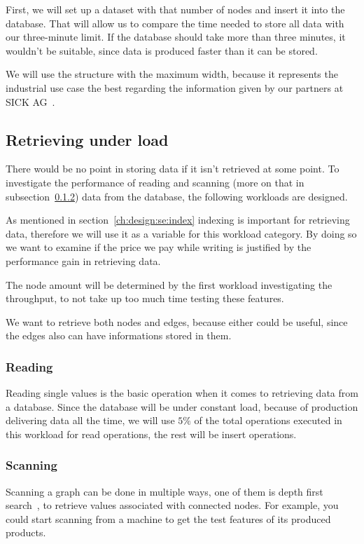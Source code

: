 First,
we will set up a dataset with that number of nodes and insert it into the database.
That will allow us to compare the time needed to store all data with our three-minute limit.
If the database should take more than three minutes,
it wouldn't be suitable,
since data is produced faster than it can be stored.

We will use the structure with the maximum width,
because it represents the industrial use case the best regarding the information given by our partners at SICK AG~\cite{SICK}.

\subsection{Retrieving under load}
\label{ch:design:se:retrievingUnderLoad}
There would be no point in storing data if it isn't retrieved at some point.
To investigate the performance of reading and scanning (more on that in subsection~\ref{ch:design:se:scanning}) data from the database,
the following workloads are designed.

As mentioned in section~\ref{ch:design:se:index} indexing is important for retrieving data,
therefore we will use it as a variable for this workload category.
By doing so we want to examine if the price we pay while writing is justified by the performance gain in retrieving data.

The node amount will be determined by the first workload investigating the throughput,
to not take up too much time testing these features.

We want to retrieve both nodes and edges,
because either could be useful,
since the edges also can have informations stored in them.

\subsubsection{Reading}
\label{ch:design:se:reading}
Reading single values is the basic operation when it comes to retrieving data from a database.
Since the database will be under constant load,
because of production delivering data all the time,
we will use $ 5\% $ of the total operations executed in this workload for read operations,
the rest will be insert operations.

\subsubsection{Scanning}
\label{ch:design:se:scanning}
Scanning a graph can be done in multiple ways,
one of them is depth first search~\cite{Tarjan1972},
to retrieve values associated with connected nodes.
For example,
you could start scanning from a machine to get the test features of its produced products.

